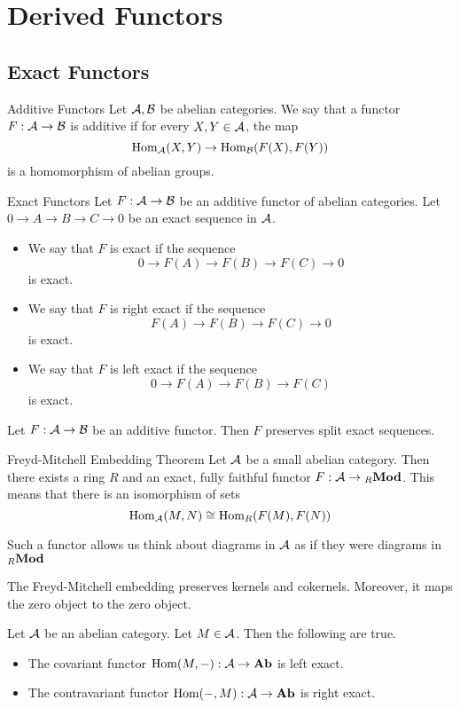 \documentclass[a4paper]{article}
\begin{document}
\pagebreak
\section{Derived Functors}
\subsection{Exact Functors}
\begin{defn}{Additive Functors}{} Let $\mathcal{A},\mathcal{B}$ be abelian categories. We say that a functor $F:\mathcal{A}\to\mathcal{B}$ is additive if for every $X,Y\in\mathcal{A}$, the map $$\operatorname{Hom}_{\mathcal{A}}(X,Y)\to\operatorname{Hom}_{\mathcal{B}}(F(X),F(Y))$$ is a homomorphism of abelian groups. 
\end{defn}

\begin{defn}{Exact Functors}{} Let $F:\mathcal{A}\to\mathcal{B}$ be an additive functor of abelian categories. Let $0\to A\to B\to C\to 0$ be an exact sequence in $\mathcal{A}$. 
\begin{itemize}
\item We say that $F$ is exact if the sequence $$0\to F(A)\to F(B)\to F(C)\to 0$$ is exact. 
\item We say that $F$ is right exact if the sequence $$F(A)\to F(B)\to F(C)\to 0$$ is exact. 
\item We say that $F$ is left exact if the sequence $$0\to F(A)\to F(B)\to F(C)$$ is exact. 
\end{itemize}
\end{defn}

\begin{prp}{}{} Let $F:\mathcal{A}\to\mathcal{B}$ be an additive functor. Then $F$ preserves split exact sequences. 
\end{prp}

\begin{thm}{Freyd-Mitchell Embedding Theorem}{} Let $\mathcal{A}$ be a small abelian category. Then there exists a ring $R$ and an exact, fully faithful functor $F:\mathcal{A}\to{_R\bold{Mod}}$. This means that there is an isomorphism of sets $$\operatorname{Hom}_{\mathcal{A}}(M,N)\cong\operatorname{Hom}_R(F(M),F(N))$$ 
\end{thm}

Such a functor allows us think about diagrams in $\mathcal{A}$ as if they were diagrams in ${_R\bold{Mod}}$

\begin{lmm}{}{} The Freyd-Mitchell embedding preserves kernels and cokernels. Moreover, it maps the zero object to the zero object. 
\end{lmm}

\begin{thm}{}{} Let $\mathcal{A}$ be an abelian category. Let $M\in\mathcal{A}$. Then the following are true. 
\begin{itemize}
\item The covariant functor $\operatorname{Hom}(M,-):\mathcal{A}\to\bold{Ab}$ is left exact. 
\item The contravariant functor $\operatorname{Hom}(-,M):\mathcal{A}\to\bold{Ab}$ is right exact. 
\end{itemize}
\end{thm}
\end{document}
